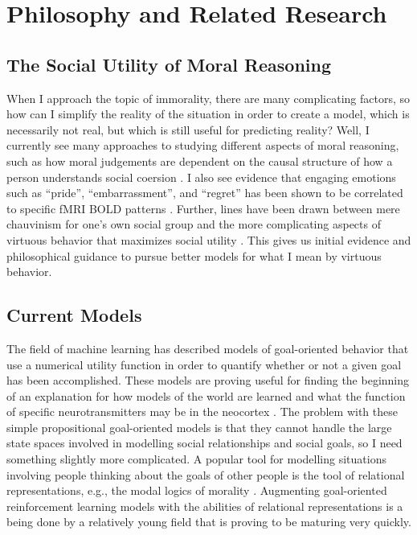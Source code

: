 \section{Philosophy and Related Research}

\subsection{The Social Utility of Moral Reasoning}

When I approach the topic of immorality, there are many complicating
factors, so how can I simplify the reality of the situation in order
to create a model, which is necessarily not real, but which is still
useful for predicting reality? Well, I currently see many approaches
to studying different aspects of moral reasoning, such as how moral
judgements are dependent on the causal structure of how a person
understands social coersion \citep{young:2011}. I also see evidence
that engaging emotions such as ``pride'', ``embarrassment'', and
``regret'' has been shown to be correlated to specific fMRI BOLD
patterns \citep{moll:2005}. Further, lines have been drawn between
mere chauvinism for one's own social group and the more complicating
aspects of virtuous behavior that maximizes social utility
\citep{casebeer:2003}. This gives us initial evidence and
philosophical guidance to pursue better models for what I mean by
virtuous behavior.

\subsection{Current Models}

The field of machine learning has described models of goal-oriented
behavior that use a numerical utility function in order to quantify
whether or not a given goal has been accomplished. These models are
proving useful for finding the beginning of an explanation for how
models of the world are learned and what the function of specific
neurotransmitters may be in the neocortex \citep{yu:2003}. The problem
with these simple propositional goal-oriented models is that they
cannot handle the large state spaces involved in modelling social
relationships and social goals, so I need something slightly more
complicated. A popular tool for modelling situations involving people
thinking about the goals of other people is the tool of relational
representations, e.g., the modal logics of morality
\citep{horty:1994}. Augmenting goal-oriented reinforcement learning
models with the abilities of relational representations is a being
done by a relatively young field \citep{dzeroski:2001} that is proving
to be maturing very quickly.

